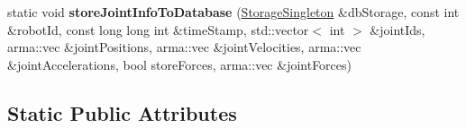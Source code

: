 \begin{DoxyCompactItemize}
\item 
static void {\bfseries store\+Joint\+Info\+To\+Database} (\hyperlink{classkukadu_1_1StorageSingleton}{Storage\+Singleton} \&db\+Storage, const int \&robot\+Id, const long long int \&time\+Stamp, std\+::vector$<$ int $>$ \&joint\+Ids, arma\+::vec \&joint\+Positions, arma\+::vec \&joint\+Velocities, arma\+::vec \&joint\+Accelerations, bool store\+Forces, arma\+::vec \&joint\+Forces)\hypertarget{classkukadu_1_1SensorStorage_af95e92f9849f5cc46bb14be3ef00b566}{}\label{classkukadu_1_1SensorStorage_af95e92f9849f5cc46bb14be3ef00b566}

\end{DoxyCompactItemize}
\subsection*{Static Public Attributes}
